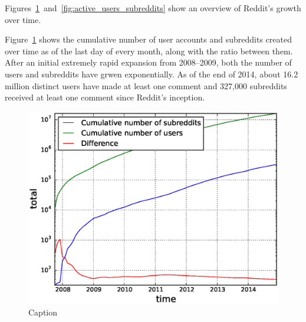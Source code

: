 {%
Figures~\ref{fig:cumulative_users_subreddits}~and~\ref{fig:active_users_subreddits} show an overview of Reddit's growth over time.  

Figure~\ref{fig:cumulative_users_subreddits} shows the cumulative number of user accounts and subreddits created over time as of the last day of every month, along with the ratio between them.  After an initial extremely rapid expansion from 2008--2009, both the number of users and subreddits have grwen exponentially.  As of the end of 2014, about 16.2 million distinct users have made at least one comment and 327,000 subreddits received at least one comment since Reddit's inception.


\begin{figure}[!tb]
\centering
\includegraphics[scale=0.4]{./images/cumulative_users_subreddits.eps}
\caption{Caption}
\label{fig:cumulative_users_subreddits}
\end{figure}

}

